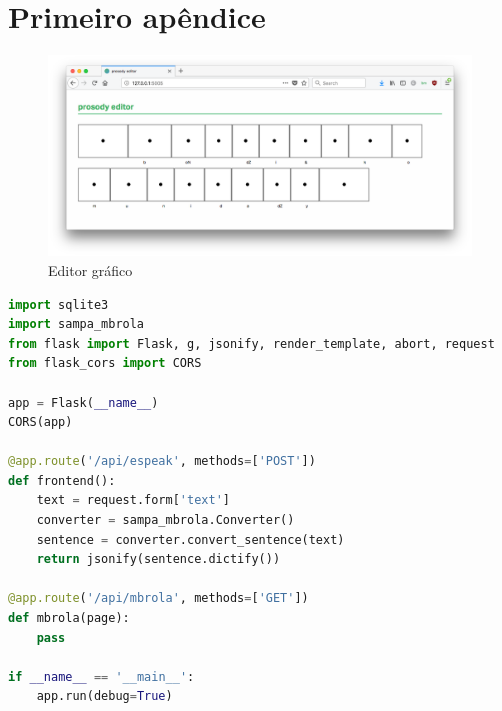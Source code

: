 \apendice
\chapter{Primeiro apêndice}

\begin{figure}
  \centering
    \includegraphics[width=1\textwidth]{Imagens/editor.png}
  \caption{Editor gráfico}
  \label{fig:ed}
\end{figure}

\begin{lstlisting}[caption=Servidor, label=servidor, language=Python]
import sqlite3
import sampa_mbrola
from flask import Flask, g, jsonify, render_template, abort, request
from flask_cors import CORS

app = Flask(__name__)
CORS(app)

@app.route('/api/espeak', methods=['POST'])
def frontend():
    text = request.form['text']
    converter = sampa_mbrola.Converter()
    sentence = converter.convert_sentence(text)
    return jsonify(sentence.dictify())

@app.route('/api/mbrola', methods=['GET'])
def mbrola(page):
    pass

if __name__ == '__main__':
    app.run(debug=True)
\end{lstlisting}

